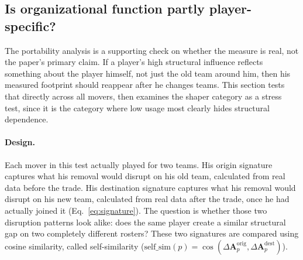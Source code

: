 \documentclass[11pt]{article}
\newcommand{\Amat}{\ensuremath{\bm{A}}} %
\newcommand{\dA}{\ensuremath{\Delta\Amat}} %
\newcommand{\cossim}{\operatorname{cos}}
\begin{document}
\subsection{Is organizational function partly player-specific?}
\label{sec:portability}

The portability analysis is a supporting check on whether the measure is real, not the
paper's primary claim. If a player's high structural influence reflects something about the
player himself, not just the old team around him, then his measured footprint should
reappear after he changes teams. This section tests that directly across all movers, then
examines the shaper category as a stress test, since it is the category where low usage
most clearly hides structural dependence.

\paragraph{Design.}
Each mover in this test actually played for two teams. His origin signature captures what
his removal would disrupt on his old team, calculated from real data before the trade. His
destination signature captures what his removal would disrupt on his new team, calculated
from real data after the trade, once he had actually joined it
(Eq.~\ref{eq:signature}). The question is whether those two disruption patterns look
alike: does the same player create a similar structural gap on two completely different
rosters? These two signatures are compared using cosine similarity, called self-similarity
($\text{self\_sim}(p)=\cossim(\dA_p^{\text{orig}},\dA_p^{\text{dest}})$).
\end{document}

